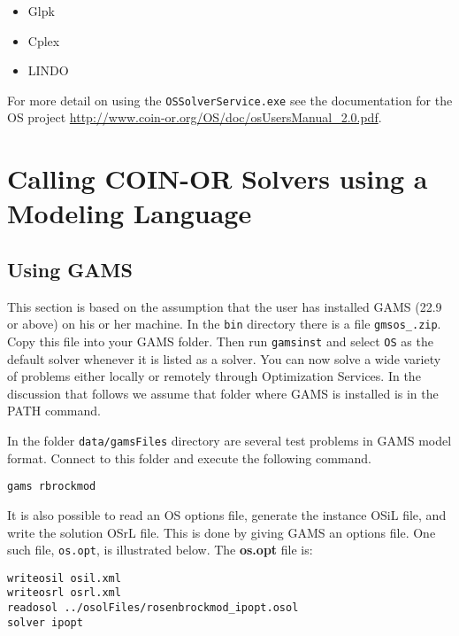 \documentclass[11pt]{article}
\renewcommand{\{}{{\char"7B}}
\renewcommand{\}}{{\char"7D}}
\renewcommand{\^}{{\char"0D}}
\renewcommand{\'}{{\char"0D}}
\begin{document}
\begin{itemize}

 \item Glpk 

 \item Cplex 

 \item LINDO

\end{itemize}


For more detail on using the {\tt OSSolverService.exe} see the documentation for the OS project 
\url{http://www.coin-or.org/OS/doc/osUsersManual_2.0.pdf}.

\section{Calling COIN-OR  Solvers using a Modeling Language}\label{section:modellanguage}


\subsection{Using GAMS}

This section is based on the assumption that the user has installed GAMS (22.9 or above) on his or her machine.   In the {\tt bin}  directory there is a file {\tt gmsos\_.zip}. Copy this file into your GAMS folder. Then run {\tt gamsinst} and select {\tt OS}  as the default solver whenever it is listed as a solver.   You can now solve  a wide variety of  problems either locally or remotely through Optimization Services. In the discussion that follows we assume that folder where GAMS is installed is in the PATH command.


In  the folder {\tt data/gamsFiles} directory are several test problems in GAMS model format.  Connect to this folder and execute the following command.

\begin{verbatim}
gams rbrockmod
\end{verbatim}

It is also possible to read an OS options file, generate the instance OSiL file, and write the solution  OSrL file.
This is done by giving GAMS an options file. One such file, {\tt os.opt}, is illustrated below. The {\bf os.opt} file is:

\begin{verbatim}
writeosil osil.xml
writeosrl osrl.xml
readosol ../osolFiles/rosenbrockmod_ipopt.osol
solver ipopt
\end{verbatim}
\end{document}
